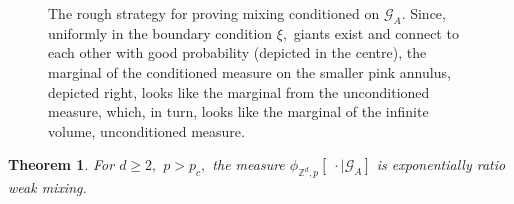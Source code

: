 \documentclass[article,11pt,reqno]{amsart}
\newtheorem{theorem}{Theorem}[section]
\begin{document}
\begin{figure}
    \centering
    
    \caption{The rough strategy for proving mixing conditioned on $\mathcal{G}_A$. Since, uniformly in the boundary condition $\xi,$ giants exist and connect to each other with good probability (depicted in the centre), the marginal of the conditioned measure on the smaller pink annulus, depicted right, looks like the marginal from the unconditioned measure, which, in turn, looks like the marginal of the infinite volume, unconditioned measure.}
    \label{fig:Mixing_strat}
\end{figure}


\begin{theorem} \label{Limit_with_sources}
For $d\geq 2,$ $p>p_c,$ the measure $\phi_{\mathbb{Z}^d,p}[\;\cdot\mid  \mathcal{G}_{A}]$ is exponentially ratio weak mixing.
\end{theorem}
\end{document}
